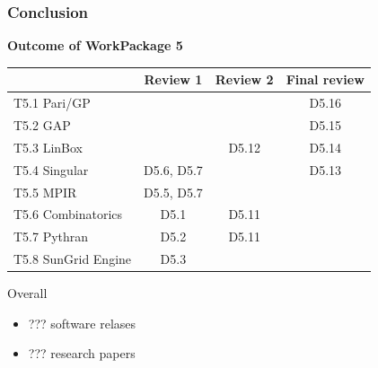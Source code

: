 \documentclass{beamer}
\begin{document}
    


\begin{frame}
  \frametitle{Conclusion}

  \textbf{Outcome of WorkPackage 5}
  \begin{center}
{\small
    \begin{tabular}{lccc}
    \toprule
        & Review 1 & Review 2 & Final review\\
    \midrule
    T5.1 Pari/GP & & & {\color{darkgreen} D5.16} \\
    T5.2 GAP     & & & {\color{darkgreen} D5.15} \\
    T5.3 LinBox  & & {D5.12} & {\color{darkgreen} D5.14} \\
    T5.4 Singular& D5.6, D5.7 & & {\color{darkgreen} D5.13} \\
    T5.5 MPIR    & D5.5, D5.7& & \\
    T5.6 Combinatorics  & D5.1& {D5.11} & \\
    T5.7 Pythran        & D5.2 & {D5.11} & \\
    T5.8 SunGrid Engine & D5.3 & & \\
    \bottomrule
    
  \end{tabular}
}
  \end{center}
  
  Overall
  \begin{itemize}
  \item ??? software relases
  \item ??? research papers
  \end{itemize}
\end{frame}
  
\end{document}
